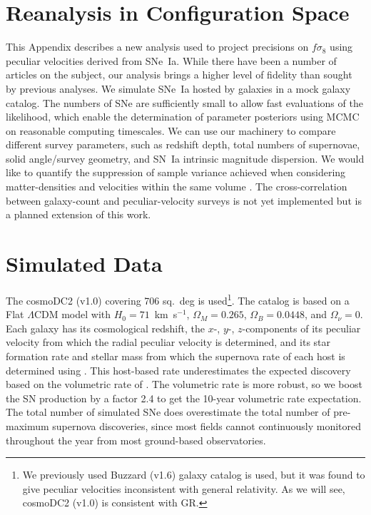 \documentclass{aastex62}   	%
\begin{document}
\section{Reanalysis in Configuration Space}

This Appendix describes a new analysis used to project precisions on $f\sigma_8$ using peculiar velocities derived from SNe~Ia.
While there have been a number of articles on the subject,
our analysis brings a higher level of fidelity than sought by previous analyses.  We simulate SNe~Ia hosted by galaxies in a mock galaxy
catalog. The numbers of SNe are sufficiently small to allow fast evaluations of the likelihood, which enable the determination of parameter
posteriors using MCMC on reasonable computing timescales.   We can use our machinery to 
compare different survey parameters, such as redshift depth, total numbers of supernovae,
solid angle/survey geometry, and SN~Ia intrinsic magnitude dispersion.
We would like to
quantify the suppression of sample variance achieved when considering matter-densities and velocities 
within the same volume \citep{2007PhRvL..99h1301G}.
The cross-correlation between galaxy-count and peculiar-velocity surveys is not yet implemented but is a planned extension of this work.  


\section{Simulated Data}
The cosmoDC2 (v1.0) covering 706 sq.~deg is used\footnote{We previously used
Buzzard (v1.6) galaxy catalog is used, but it was found to give peculiar velocities inconsistent with general relativity.  As we will see,
cosmoDC2 (v1.0) is consistent with GR. }. 
The catalog is based on a Flat $\Lambda$CDM model with $H_0=71$~km~s$^{-1}$,  $\Omega_M=0.265$, $\Omega_B=0.0448$, and
$\Omega_\nu=0$.
Each galaxy has its cosmological redshift, the $x$-, $y$-, $z$-components of its peculiar velocity from which
the radial peculiar velocity is determined, and its
star formation rate and stellar mass from which the
supernova rate of each host is determined using 
\citet{2012ApJ...755...61S}.   This host-based rate
underestimates the expected discovery based on the volumetric
rate of \citet{2010ApJ...713.1026D}.  The volumetric rate is more robust, so  we boost the SN production
by a factor 2.4 to get the 10-year volumetric rate expectation. The total number of simulated SNe 
does overestimate the total number of pre-maximum supernova discoveries, since most fields cannot continuously monitored throughout the year
from most ground-based observatories.
\end{document}

